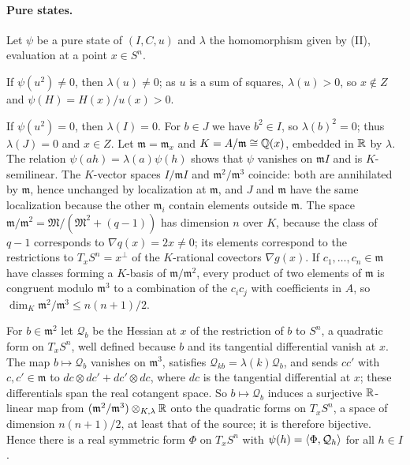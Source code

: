 \paragraph{Pure states.}
Let $\psi$ be a pure state of $(I,C,u)$ and $\lambda$ the homomorphism given
by (II), evaluation at a point $x\in S^n$.

If $\psi(u^2)\ne0$, then $\lambda(u)\ne0$; as $u$ is a sum of squares,
$\lambda(u)>0$, so $x\notin Z$ and $\psi(H)=H(x)/u(x)>0$.

If $\psi(u^2)=0$, then $\lambda(I)=0$. For $b\in J$ we have $b^2\in I$, so
$\lambda(b)^2=0$; thus $\lambda(J)=0$ and $x\in Z$. Let
$\mathfrak m=\mathfrak m_x$ and $K=A/\mathfrak m\cong\mathbb Q(x)$, embedded in $\mathbb R$
by $\lambda$. The relation $\psi(ah)=\lambda(a)\psi(h)$ shows that $\psi$
vanishes on $\mathfrak mI$ and is $K$-semilinear. The $K$-vector spaces
$I/\mathfrak mI$ and $\mathfrak m^2/\mathfrak m^3$ coincide: both are
annihilated by $\mathfrak m$, hence unchanged by localization at
$\mathfrak m$, and $J$ and $\mathfrak m$ have the same localization because
the other $\mathfrak m_i$ contain elements outside $\mathfrak m$. The space
$\mathfrak m/\mathfrak m^2=\mathfrak M/(\mathfrak M^2+(q-1))$ has dimension
$n$ over $K$, because the class of $q-1$ corresponds to $\nabla q(x)=2x\ne0$;
its elements correspond to the restrictions to $T_xS^n=x^\perp$ of the
$K$-rational covectors $\nabla g(x)$. If $c_1,\ldots,c_n\in\mathfrak m$ have
classes forming a $K$-basis of $\mathfrak m/\mathfrak m^2$, every product of
two elements of $\mathfrak m$ is congruent modulo $\mathfrak m^3$ to a
combination of the $c_ic_j$ with coefficients in $A$, so
$\dim_K\mathfrak m^2/\mathfrak m^3\le n(n+1)/2$.

For $b\in\mathfrak m^2$ let $\mathcal Q_b$ be the Hessian at $x$ of the
restriction of $b$ to $S^n$, a quadratic form on $T_xS^n$, well defined
because $b$ and its tangential differential vanish at $x$. The map
$b\mapsto\mathcal Q_b$ vanishes on $\mathfrak m^3$, satisfies
$\mathcal Q_{kb}=\lambda(k)\mathcal Q_b$, and sends $cc'$ with
$c,c'\in\mathfrak m$ to $dc\otimes dc'+dc'\otimes dc$, where $dc$ is the
tangential differential at $x$; these differentials span the real cotangent
space. So $b\mapsto\mathcal Q_b$ induces a surjective $\mathbb R$-linear map from
$(\mathfrak m^2/\mathfrak m^3)\otimes_{K,\lambda}\mathbb R$ onto the quadratic forms on
$T_xS^n$, a space of dimension $n(n+1)/2$, at least that of the source; it is
therefore bijective. Hence there is a real symmetric form $\Phi$ on $T_xS^n$
with $\psi(h)=\left\langle\Phi,\mathcal Q_h\right\rangle$ for all $h\in I$.

